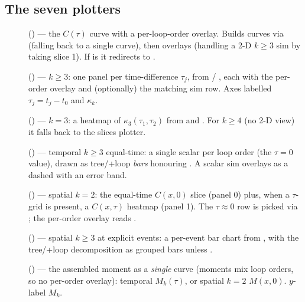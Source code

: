 \subsection{The seven plotters}

\begin{description}
  \item[] () --- the $C(\tau)$
        curve with a per-loop-order overlay. Builds curves via
         (falling back to a single  curve),
        then overlays  (handling a 2-D $k\ge 3$ sim by taking slice 1).
        If  is  it redirects to
        .
  \item[] ()
        --- $k\ge 3$: one panel per time-difference $\tau_j$, from
         / , each with the
        per-order overlay and (optionally) the matching sim row. Axes labelled
        $\tau_j = t_j - t_0$ and $\kappa_k$.
  \item[] ()
        --- $k=3$: a  heatmap of $\kappa_3(\tau_1,\tau_2)$ from
         and . For $k\ge 4$ (no 2-D view) it
        falls back to the slices plotter.
  \item[] () ---
        temporal $k\ge 3$ equal-time: a single scalar per loop order (the $\tau=0$
        value), drawn as tree/+loop \emph{bars} honouring . A
        scalar sim overlays as a dashed  with an 
        error band.
  \item[] () --- spatial
        $k=2$: the equal-time $C(x,0)$ slice (panel 0) plus, when a $\tau$-grid is
        present, a $C(x,\tau)$  heatmap (panel 1). The $\tau\approx 0$
        row is picked via ; the per-order overlay reads
        .
  \item[] () --- spatial
        $k\ge 3$ at explicit events: a per-event bar chart from ,
        with the tree/+loop decomposition as grouped bars unless
        .
  \item[] () --- the
        assembled moment as a \emph{single} curve (moments mix loop orders, so no
        per-order overlay): temporal $M_k(\tau)$, or spatial $k=2$ $M(x,0)$.
        $y$-label $M_k$.
\end{description}

